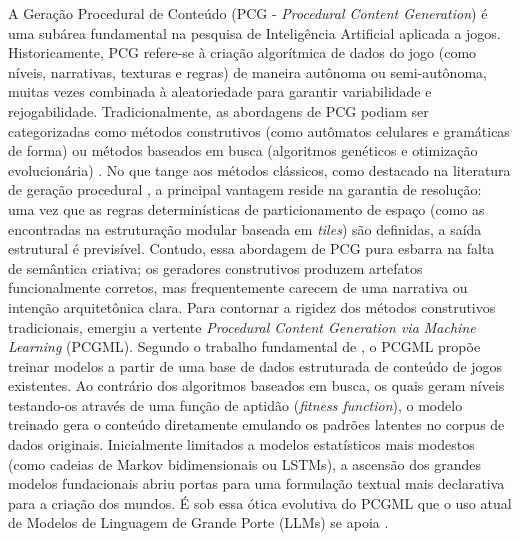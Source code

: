 A Geração Procedural de Conteúdo (PCG - \textit{Procedural Content Generation}) é uma subárea fundamental na pesquisa de Inteligência Artificial aplicada a jogos. Historicamente, PCG refere-se à criação algorítmica de dados do jogo (como níveis, narrativas, texturas e regras) de maneira autônoma ou semi-autônoma, muitas vezes combinada à aleatoriedade para garantir variabilidade e rejogabilidade. Tradicionalmente, as abordagens de PCG podiam ser categorizadas como métodos construtivos (como autômatos celulares e gramáticas de forma) ou métodos baseados em busca (algoritmos genéticos e otimização evolucionária) \cite{summerville2018procedural}. 
No que tange aos métodos clássicos, como destacado na literatura de geração procedural \cite{vieira2024metodologia}, a principal vantagem reside na garantia de resolução: uma vez que as regras determinísticas de particionamento de espaço (como as encontradas na estruturação modular baseada em \textit{tiles}) são definidas, a saída estrutural é previsível. Contudo, essa abordagem de PCG pura esbarra na falta de semântica criativa; os geradores construtivos produzem artefatos funcionalmente corretos, mas frequentemente carecem de uma narrativa ou intenção arquitetônica clara.
Para contornar a rigidez dos métodos construtivos tradicionais, emergiu a vertente \textit{Procedural Content Generation via Machine Learning} (PCGML). Segundo o trabalho fundamental de \cite{summerville2018procedural}, o PCGML propõe treinar modelos a partir de uma base de dados estruturada de conteúdo de jogos existentes. Ao contrário dos algoritmos baseados em busca, os quais geram níveis testando-os através de uma função de aptidão (\textit{fitness function}), o modelo treinado gera o conteúdo diretamente emulando os padrões latentes no corpus de dados originais. Inicialmente limitados a modelos estatísticos mais modestos (como cadeias de Markov bidimensionais ou LSTMs), a ascensão dos grandes modelos fundacionais abriu portas para uma formulação textual mais declarativa para a criação dos mundos. É sob essa ótica evolutiva do PCGML que o uso atual de Modelos de Linguagem de Grande Porte (LLMs) se apoia \cite{Gallotta_2024}.

